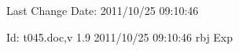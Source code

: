 Last Change $ $Date: 2011/10/25 09:10:46 $ $

$ $Id: t045.doc,v 1.9 2011/10/25 09:10:46 rbj Exp $ $

